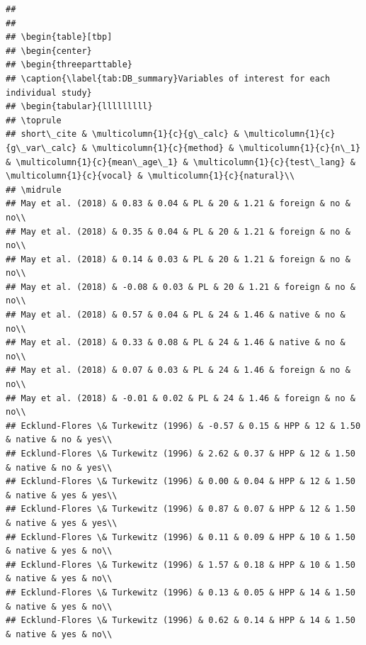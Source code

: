 \documentclass[man]{apa6}
\begin{document}
\begin{verbatim}
## 
## 
## \begin{table}[tbp]
## \begin{center}
## \begin{threeparttable}
## \caption{\label{tab:DB_summary}Variables of interest for each individual study}
## \begin{tabular}{lllllllll}
## \toprule
## short\_cite & \multicolumn{1}{c}{g\_calc} & \multicolumn{1}{c}{g\_var\_calc} & \multicolumn{1}{c}{method} & \multicolumn{1}{c}{n\_1} & \multicolumn{1}{c}{mean\_age\_1} & \multicolumn{1}{c}{test\_lang} & \multicolumn{1}{c}{vocal} & \multicolumn{1}{c}{natural}\\
## \midrule
## May et al. (2018) & 0.83 & 0.04 & PL & 20 & 1.21 & foreign & no & no\\
## May et al. (2018) & 0.35 & 0.04 & PL & 20 & 1.21 & foreign & no & no\\
## May et al. (2018) & 0.14 & 0.03 & PL & 20 & 1.21 & foreign & no & no\\
## May et al. (2018) & -0.08 & 0.03 & PL & 20 & 1.21 & foreign & no & no\\
## May et al. (2018) & 0.57 & 0.04 & PL & 24 & 1.46 & native & no & no\\
## May et al. (2018) & 0.33 & 0.08 & PL & 24 & 1.46 & native & no & no\\
## May et al. (2018) & 0.07 & 0.03 & PL & 24 & 1.46 & foreign & no & no\\
## May et al. (2018) & -0.01 & 0.02 & PL & 24 & 1.46 & foreign & no & no\\
## Ecklund-Flores \& Turkewitz (1996) & -0.57 & 0.15 & HPP & 12 & 1.50 & native & no & yes\\
## Ecklund-Flores \& Turkewitz (1996) & 2.62 & 0.37 & HPP & 12 & 1.50 & native & no & yes\\
## Ecklund-Flores \& Turkewitz (1996) & 0.00 & 0.04 & HPP & 12 & 1.50 & native & yes & yes\\
## Ecklund-Flores \& Turkewitz (1996) & 0.87 & 0.07 & HPP & 12 & 1.50 & native & yes & yes\\
## Ecklund-Flores \& Turkewitz (1996) & 0.11 & 0.09 & HPP & 10 & 1.50 & native & yes & no\\
## Ecklund-Flores \& Turkewitz (1996) & 1.57 & 0.18 & HPP & 10 & 1.50 & native & yes & no\\
## Ecklund-Flores \& Turkewitz (1996) & 0.13 & 0.05 & HPP & 14 & 1.50 & native & yes & no\\
## Ecklund-Flores \& Turkewitz (1996) & 0.62 & 0.14 & HPP & 14 & 1.50 & native & yes & no\\

\end{verbatim}
\end{document}
